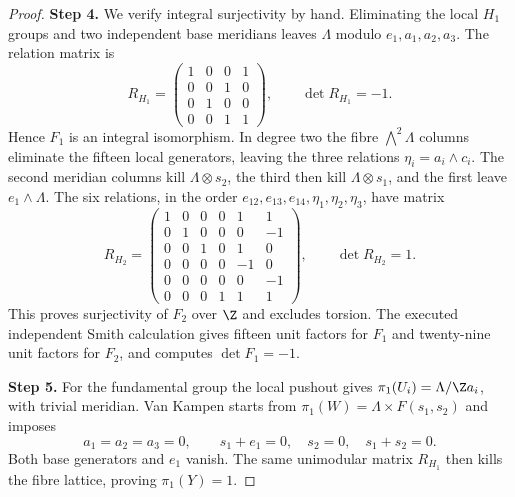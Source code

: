 \begin{proof}
\noindent\textbf{Step 4.} We verify integral surjectivity by hand. Eliminating the local $H_1$
groups and two independent base meridians leaves $\Lambda$ modulo
$e_1,a_1,a_2,a_3$. The relation matrix is
\[
 R_{H_1}=\begin{pmatrix}1&0&0&1\\0&0&1&0\\0&1&0&0\\0&0&1&1\end{pmatrix},
 \qquad\det R_{H_1}=-1.
\]
Hence $F_1$ is an integral isomorphism. In degree two the fibre
$\bigwedge^2\Lambda$ columns eliminate the fifteen local generators,
leaving the three relations $\eta_i=a_i\wedge c_i$. The second meridian
columns kill $\Lambda\otimes s_2$, the third then kill
$\Lambda\otimes s_1$, and the first leave $e_1\wedge\Lambda$. The six
relations, in the order $e_{12},e_{13},e_{14},\eta_1,\eta_2,\eta_3$, have
matrix
\[
R_{H_2}=\begin{pmatrix}
1&0&0&0&1&1\\0&1&0&0&0&-1\\0&0&1&0&1&0\\
0&0&0&0&-1&0\\0&0&0&0&0&-1\\0&0&0&1&1&1
\end{pmatrix},\qquad \det R_{H_2}=1.
\]
This proves surjectivity of $F_2$ over $\Z$ and excludes torsion. The
executed independent Smith calculation gives fifteen unit factors for
$F_1$ and twenty-nine unit factors for $F_2$, and computes $\det F_1=-1$.

\noindent\textbf{Step 5.} For the fundamental group the local pushout gives
$\pi_1(U_i)=\Lambda/\Z a_i$, with trivial meridian. Van Kampen starts
from $\pi_1(W)=\Lambda\times F(s_1,s_2)$ and imposes
\[
 a_1=a_2=a_3=0,\qquad s_1+e_1=0,\quad s_2=0,\quad s_1+s_2=0.
\]
Both base generators and $e_1$ vanish. The same unimodular matrix
$R_{H_1}$ then kills the fibre lattice, proving $\pi_1(Y)=1$.
\end{proof}

